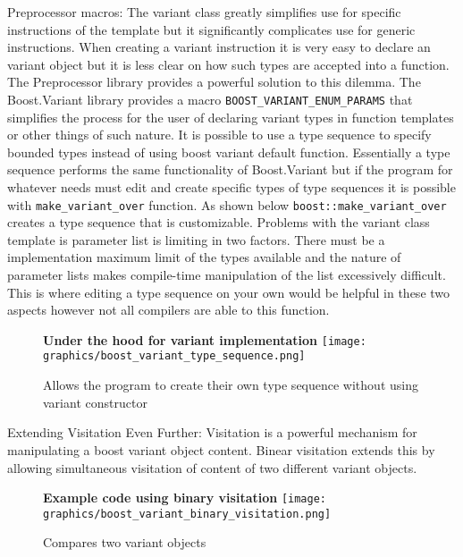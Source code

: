 \documentclass[letterpaper, 12pt]{article}
\newcommand{\inlinecode}[1]{\colorbox{codegrey}{\lstinline[language=C++]{#1}}}
\begin{document}
Preprocessor macros:
The variant class greatly simplifies use for specific instructions of the template but it
significantly complicates use for generic instructions. When creating a variant instruction
it is very easy to declare an variant object but it is less clear on how such types are
accepted into a function. The Preprocessor library provides a powerful solution to this dilemma.
The Boost.Variant library provides a macro \inlinecode{BOOST_VARIANT_ENUM_PARAMS} that
simplifies the process for the user of declaring variant types in function templates or
other things of such nature. It is possible to use a type sequence to specify bounded types
instead of using boost variant default function. Essentially a type sequence performs the
same functionality of Boost.Variant but if the program for whatever needs must edit and
create specific types of type sequences it is possible with \inlinecode{make_variant_over}
function. As shown below \inlinecode{boost::make_variant_over} creates a type sequence that
is customizable. Problems with the variant class template is parameter list is limiting in
two factors. There must be a implementation maximum limit of the types available and the
nature of parameter lists makes compile-time manipulation of the list excessively difficult.
This is where editing a type sequence on your own would be helpful in these two aspects
however not all compilers are able to this function.
\par\vspace{\baselineskip}

\begin{figure}
  \centering
  \textbf{Under the hood for variant implementation}
  \texttt{[image: graphics/boost\_variant\_type\_sequence.png]}
  \cite{boostvariant}
  \caption{Allows the program to create their own type sequence without using variant constructor}
\end{figure}

Extending Visitation Even Further:
Visitation is a powerful mechanism for manipulating a boost variant object content. Binear visitation
extends this by allowing simultaneous visitation of content of two different variant objects.
\par\vspace{\baselineskip}

\begin{figure}
  \centering
  \textbf{Example code using binary visitation}
  \texttt{[image: graphics/boost\_variant\_binary\_visitation.png]}
  \cite{boostvariant}
  \caption{Compares two variant objects}
\end{figure}
\end{document}
